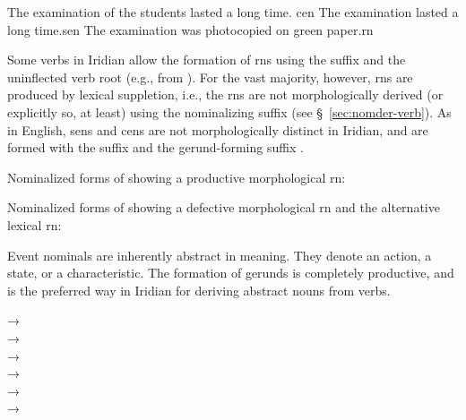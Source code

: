 \pex[interpartskip=0pt]
	\a The examination of the students lasted a long time. \hfill {\sc cen}
	\a The examination lasted a long time.\hfill {\sc sen}
	\a The examination was photocopied on green paper.\hfill {\sc rn}\\
\xe

Some verbs in Iridian allow the formation of {\sc rn}s using the suffix
 and the uninflected verb root (e.g.,  from
). For the vast majority, however, {\sc rn}s are produced
by lexical suppletion, i.e., the {\sc rn}s are not morphologically derived (or
explicitly so, at least) using the nominalizing suffix (see
\S~\ref{sec:nomder-verb}). As in English, {\sc sen}s and {\sc cen}s are not
morphologically distinct in Iridian, and are formed with the suffix 
and the gerund-forming suffix .

\pex
\a Nominalized forms of  showing a productive
morphological {\sc rn}:\smallskip\\

\a Nominalized forms of  showing a defective morphological
{\sc rn} and the alternative lexical {\sc rn}:\smallskip\\
\xe

Event nominals are inherently abstract in meaning. They denote an action, a
state, or a characteristic. The formation of gerunds is completely
productive, and is the preferred way in Iridian for deriving abstract nouns from
verbs.

\pex    
		 → \\
		 → \\
         → \\
         → \\
         → \\
         → \\
\xe

